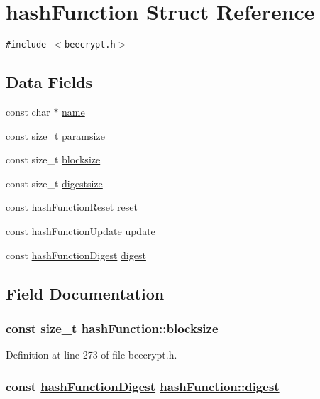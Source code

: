 \hypertarget{structhashFunction}{
\section{hash\-Function Struct Reference}
\label{structhashFunction}
}
{\tt \#include $<$beecrypt.h$>$}

\subsection*{Data Fields}
\begin{CompactItemize}
\item 
const char $\ast$ \hyperlink{structhashFunction_o0}{name}
\item 
const size\_\-t \hyperlink{structhashFunction_o1}{paramsize}
\item 
const size\_\-t \hyperlink{structhashFunction_o2}{blocksize}
\item 
const size\_\-t \hyperlink{structhashFunction_o3}{digestsize}
\item 
const \hyperlink{beecrypt_8h_a7}{hash\-Function\-Reset} \hyperlink{structhashFunction_o4}{reset}
\item 
const \hyperlink{beecrypt_8h_a8}{hash\-Function\-Update} \hyperlink{structhashFunction_o5}{update}
\item 
const \hyperlink{beecrypt_8h_a9}{hash\-Function\-Digest} \hyperlink{structhashFunction_o6}{digest}
\end{CompactItemize}


\subsection{Field Documentation}
\hypertarget{structhashFunction_o2}{
\subsubsection[blocksize]{\setlength{\rightskip}{0pt plus 5cm}const size\_\-t \hyperlink{structhashFunction_o2}{hash\-Function::blocksize}}}
\label{structhashFunction_o2}


Definition at line 273 of file beecrypt.h.\hypertarget{structhashFunction_o6}{
\subsubsection[digest]{\setlength{\rightskip}{0pt plus 5cm}const \hyperlink{beecrypt_8h_a9}{hash\-Function\-Digest} \hyperlink{structhashFunction_o6}{hash\-Function::digest}}}
\label{structhashFunction_o6}


